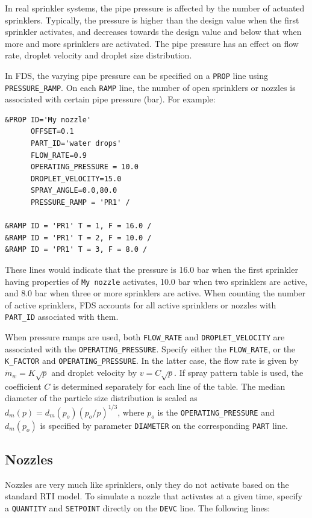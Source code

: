 \documentclass[11pt]{book}
\newcommand{\ct}{\tt\small}
\newcommand{\dm}{\dot{m}}
\begin{document}
In real sprinkler systems, the pipe pressure is affected by the number of actuated sprinklers. Typically,
the pressure is higher than the design value when the first sprinkler activates, and decreases towards the design
value and below that when more and more sprinklers are activated. The pipe pressure has an effect on flow rate,
droplet velocity and droplet size distribution.

In FDS, the varying pipe pressure can be specified on a {\ct PROP} line using {\ct PRESSURE\_RAMP}. On each {\ct RAMP} line,
the number of open sprinklers or nozzles is associated with certain pipe pressure (bar). For example:

\footnotesize
\begin{verbatim}
&PROP ID='My nozzle'
      OFFSET=0.1
      PART_ID='water drops'
      FLOW_RATE=0.9
      OPERATING_PRESSURE = 10.0
      DROPLET_VELOCITY=15.0
      SPRAY_ANGLE=0.0,80.0
      PRESSURE_RAMP = 'PR1' /

&RAMP ID = 'PR1' T = 1, F = 16.0 /
&RAMP ID = 'PR1' T = 2, F = 10.0 /
&RAMP ID = 'PR1' T = 3, F = 8.0 /
\end{verbatim}
\normalsize
\noindent
These lines would indicate that the pressure is 16.0 bar when the first sprinkler having properties of {\ct My nozzle}
activates, 10.0 bar when two sprinklers are active, and 8.0 bar when three or more sprinklers are active. When counting the
number of active sprinklers, FDS accounts for all active sprinklers or nozzles with {\ct PART\_ID} associated with them.

When pressure ramps are used, both {\ct FLOW\_RATE} and {\ct DROPLET\_VELOCITY} are associated with the
{\ct OPERATING\_PRESSURE}. Specify either the {\ct FLOW\_RATE}, or the
{\ct K\_FACTOR} and {\ct OPERATING\_PRESSURE}. In the latter case, the flow rate is given by $ \dm_w = K \sqrt{p}$ and droplet velocity
by $v = C \sqrt{p}$.  If spray pattern table is used, the coefficient $C$ is determined separately for each line of the
table. The median diameter of the particle size distribution is scaled as
$d_m(p) = d_m(p_o)(p_o/p)^{1/3}$, where $p_o$ is the {\ct OPERATING\_PRESSURE}
and $d_m(p_o)$ is specified by parameter {\ct DIAMETER} on the corresponding {\ct PART} line.

\subsection{Nozzles}
\label{info:nozzles}

Nozzles are very much like sprinklers, only they do not activate based on the standard RTI model.
To simulate a nozzle that activates at a given time,
specify a {\ct QUANTITY} and {\ct SETPOINT} directly on the {\ct DEVC} line.
The following lines:
\end{document}
